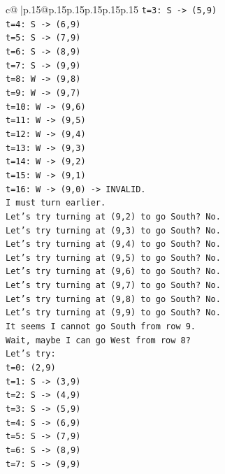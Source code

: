 \documentclass{article}
\begin{document}
{\begin{supertabular}{c@{$\;$}|p{.15\linewidth}@{}p{.15\linewidth}p{.15\linewidth}p{.15\linewidth}p{.15\linewidth}p{.15\linewidth}}
{{{\texttt{t=3: S {-}> (5,9)} \\
\texttt{t=4: S {-}> (6,9)} \\
\texttt{t=5: S {-}> (7,9)} \\
\texttt{t=6: S {-}> (8,9)} \\
\texttt{t=7: S {-}> (9,9)} \\
\texttt{t=8: W {-}> (9,8)} \\
\texttt{t=9: W {-}> (9,7)} \\
\texttt{t=10: W {-}> (9,6)} \\
\texttt{t=11: W {-}> (9,5)} \\
\texttt{t=12: W {-}> (9,4)} \\
\texttt{t=13: W {-}> (9,3)} \\
\texttt{t=14: W {-}> (9,2)} \\
\texttt{t=15: W {-}> (9,1)} \\
\texttt{t=16: W {-}> (9,0) {-}> INVALID.} \\
\texttt{I must turn earlier.} \\
\texttt{Let's try turning at (9,2) to go South? No.} \\
\texttt{Let's try turning at (9,3) to go South? No.} \\
\texttt{Let's try turning at (9,4) to go South? No.} \\
\texttt{Let's try turning at (9,5) to go South? No.} \\
\texttt{Let's try turning at (9,6) to go South? No.} \\
\texttt{Let's try turning at (9,7) to go South? No.} \\
\texttt{Let's try turning at (9,8) to go South? No.} \\
\texttt{Let's try turning at (9,9) to go South? No.} \\
\texttt{It seems I cannot go South from row 9.} \\
\texttt{Wait, maybe I can go West from row 8?} \\
\texttt{Let's try:} \\
\texttt{t=0: (2,9)} \\
\texttt{t=1: S {-}> (3,9)} \\
\texttt{t=2: S {-}> (4,9)} \\
\texttt{t=3: S {-}> (5,9)} \\
\texttt{t=4: S {-}> (6,9)} \\
\texttt{t=5: S {-}> (7,9)} \\
\texttt{t=6: S {-}> (8,9)} \\
\texttt{t=7: S {-}> (9,9)} \\
}}}
\end{supertabular}}
\end{document}
